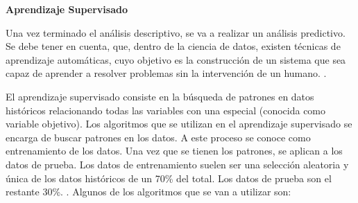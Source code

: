
\textbf{Aprendizaje Supervisado}

Una vez terminado el análisis descriptivo, se va a realizar un análisis predictivo. Se debe tener en cuenta, que, dentro de la ciencia de datos, existen técnicas de aprendizaje automáticas, cuyo objetivo es la construcción de un sistema que sea capaz de aprender a resolver problemas sin la intervención de un humano. \cite{MARIN2018}.

El aprendizaje supervisado consiste en la búsqueda de patrones en datos históricos relacionando todas las variables con una especial (conocida como variable objetivo). Los algoritmos que se utilizan en el aprendizaje supervisado se encarga de buscar patrones en los datos. A este proceso se conoce como entrenamiento de los datos. Una vez que se tienen los patrones, se aplican a los datos de prueba. Los datos de entrenamiento suelen ser una selección aleatoria y única de los datos históricos de un 70\% del total. Los datos de prueba son el restante 30\%. \cite{Manguart2017}.
Algunos de los algoritmos que se van a utilizar son:
